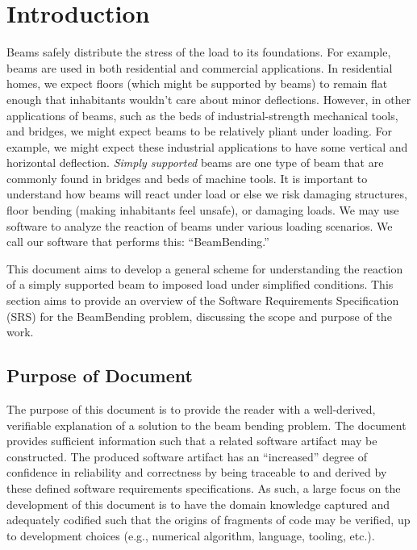 \documentclass[12pt]{article}
\begin{document}
\section{Introduction}

Beams safely distribute the stress of the load to its foundations. For example,
beams are used in both residential and commercial applications. In residential
homes, we expect floors (which might be supported by beams) to remain flat
enough that inhabitants wouldn't care about minor deflections. However, in other
applications of beams, such as the beds of industrial-strength mechanical tools,
and bridges, we might expect beams to be relatively pliant under loading. For
example, we might expect these industrial applications to have some vertical and
horizontal deflection. \textit{Simply supported} beams are one type of beam that
are commonly found in bridges and beds of machine tools. It is important to
understand how beams will react under load or else we risk damaging structures,
floor bending (making inhabitants feel unsafe), or damaging loads. We may use
software to analyze the reaction of beams under various loading scenarios. We
call our software that performs this: ``BeamBending.''

This document aims to develop a general scheme for understanding the reaction of
a simply supported beam to imposed load under simplified conditions. This
section aims to provide an overview of the Software Requirements Specification
(SRS) for the BeamBending problem, discussing the scope and purpose of the work.

\subsection{Purpose of Document}

The purpose of this document is to provide the reader with a well-derived,
verifiable explanation of a solution to the beam bending problem. The document
provides sufficient information such that a related software artifact may be
constructed. The produced software artifact has an ``increased'' degree of
confidence in reliability and correctness by being traceable to and derived by
these defined software requirements specifications. As such, a large focus on
the development of this document is to have the domain knowledge captured and
adequately codified such that the origins of fragments of code may be verified,
up to development choices (e.g., numerical algorithm, language, tooling, etc.).
\end{document}
